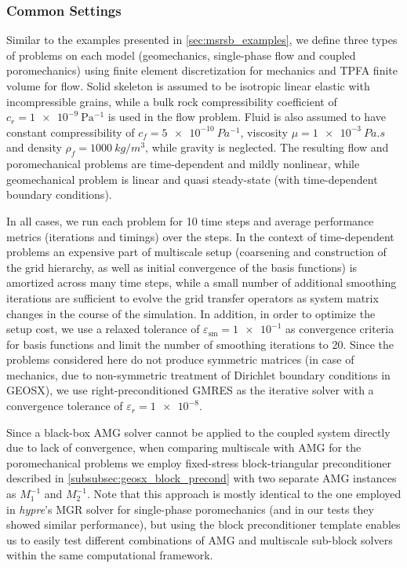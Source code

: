 \subsubsection{Common Settings}

Similar to the examples presented in \cref{sec:msrsb_examples}, we define three types of problems on each model (geomechanics, single-phase flow and coupled poromechanics) using finite element discretization for mechanics and TPFA finite volume for flow.   Solid skeleton is assumed to be isotropic linear elastic with incompressible grains, while a bulk rock compressibility coefficient of $c_r = \qty{1e-9}{\Pa^{-1}}$ is used in the flow problem.   Fluid is also assumed to have constant compressibility of $c_f = \qty{5e-10}{Pa^{-1}}$, viscosity $\mu = \qty{1e-3}{Pa.s}$ and density $\rho_f = \qty{1000}{kg/m^3}$, while gravity is neglected.   The resulting flow and poromechanical problems are time-dependent and mildly nonlinear, while geomechanical problem is linear and quasi steady-state (with time-dependent boundary conditions).

In all cases, we run each problem for 10 time steps and average performance metrics (iterations and timings) over the steps.   In the context of time-dependent problems an expensive part of multiscale setup (coarsening and construction of the grid hierarchy, as well as initial convergence of the basis functions) is amortized across many time steps, while a small number of additional smoothing iterations are sufficient to evolve the grid transfer operators as system matrix changes in the course of the simulation.   In addition, in order to optimize the setup cost, we use a relaxed tolerance of $\varepsilon_{\text{sm}} = \num{1e-1}$ as convergence criteria for basis functions and limit the number of smoothing iterations to 20.   Since the problems considered here do not produce symmetric matrices (in case of mechanics, due to non-symmetric treatment of Dirichlet boundary conditions in GEOSX), we use right-preconditioned GMRES as the iterative solver with a convergence tolerance of $\varepsilon_r = \num{1e-8}$.

Since a black-box AMG solver cannot be applied to the coupled system directly due to lack of convergence, when comparing multiscale with AMG for the poromechanical problems we employ fixed-stress block-triangular preconditioner described in \cref{subsubsec:geosx_block_precond} with two separate AMG instances as $M_1^{-1}$ and $M_2^{-1}$.   Note that this approach is mostly identical to the one employed in \textit{hypre}'s MGR solver \cite{Bui2020} for single-phase poromechanics (and in our tests they showed similar performance), but using the block preconditioner template enables us to easily test different combinations of AMG and multiscale sub-block solvers within the same computational framework.

